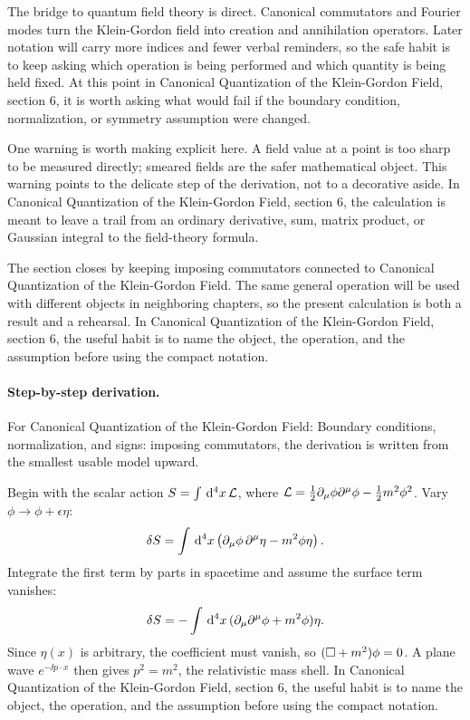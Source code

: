 The bridge to quantum field theory is direct.  Canonical commutators and Fourier modes turn the Klein-Gordon field into creation and annihilation operators.  Later notation will carry more indices and fewer verbal reminders, so the safe habit is to keep asking which operation is being performed and which quantity is being held fixed.  At this point in Canonical Quantization of the Klein-Gordon Field, section 6, it is worth asking what would fail if the boundary condition, normalization, or symmetry assumption were changed.

One warning is worth making explicit here.  A field value at a point is too sharp to be measured directly; smeared fields are the safer mathematical object.  This warning points to the delicate step of the derivation, not to a decorative aside.  In Canonical Quantization of the Klein-Gordon Field, section 6, the calculation is meant to leave a trail from an ordinary derivative, sum, matrix product, or Gaussian integral to the field-theory formula.

The section closes by keeping imposing commutators connected to Canonical Quantization of the Klein-Gordon Field.  The same general operation will be used with different objects in neighboring chapters, so the present calculation is both a result and a rehearsal.  In Canonical Quantization of the Klein-Gordon Field, section 6, the useful habit is to name the object, the operation, and the assumption before using the compact notation.



\paragraph{Step-by-step derivation.}

For Canonical Quantization of the Klein-Gordon Field: Boundary conditions, normalization, and signs: imposing commutators, the derivation is written from the smallest usable model upward.

Begin with the scalar action \(S=\int\,\mathrm d^4x\,\mathcal L\), where \(\mathcal L=\frac12\partial_\mu\phi\partial^\mu\phi-\frac12m^2\phi^2\).  Vary \(\phi\to\phi+\epsilon\eta\):
\[
  \delta S=\int\,\mathrm d^4x\left(\partial_\mu\phi\,\partial^\mu\eta-m^2\phi\eta\right).
\]
Integrate the first term by parts in spacetime and assume the surface term vanishes:
\[
  \delta S=-\int\,\mathrm d^4x\,(\partial_\mu\partial^\mu\phi+m^2\phi)\eta.
\]
Since \(\eta(x)\) is arbitrary, the coefficient must vanish, so \((\Box+m^2)\phi=0\).  A plane wave \(e^{-\ii p\cdot x}\) then gives \(p^2=m^2\), the relativistic mass shell.  In Canonical Quantization of the Klein-Gordon Field, section 6, the useful habit is to name the object, the operation, and the assumption before using the compact notation.

